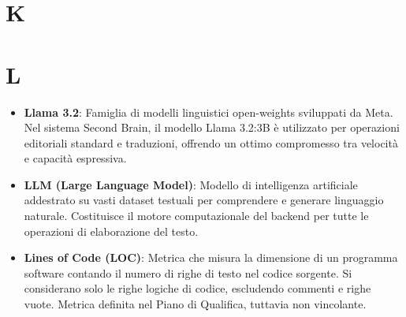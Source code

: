 \documentclass[11pt,a4paper]{article}
\begin{document}
\newpage

\section*{K}

\newpage

\section*{L}
\begin{itemize}
\item \textbf{Llama 3.2}: Famiglia di modelli linguistici open-weights sviluppati da Meta. Nel sistema Second Brain, il modello Llama 3.2:3B è utilizzato per operazioni editoriali standard e traduzioni, offrendo un ottimo compromesso tra velocità e capacità espressiva.

\item \textbf{LLM (Large Language Model)}: Modello di intelligenza artificiale addestrato su vasti dataset testuali per comprendere e generare linguaggio naturale. Costituisce il motore computazionale del backend per tutte le operazioni di elaborazione del testo.

\item \textbf{Lines of Code (LOC)}: Metrica che misura la dimensione di un programma software contando il numero di righe di testo nel codice sorgente. Si considerano solo le righe logiche di codice, escludendo commenti e righe vuote. Metrica definita nel Piano di Qualifica, tuttavia non vincolante.
\end{itemize}
\newpage
\end{document}

